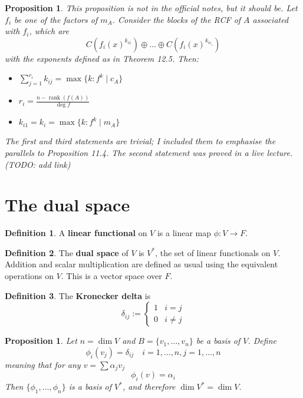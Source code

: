\documentclass[12pt]{article}
\newtheorem{prop}[thm]{Proposition}
\theoremstyle{definition}
\newtheorem*{defn*}{Definition}
\DeclareMathOperator{\rank}{rank}
\begin{document}
\begin{prop}
	This proposition is not in the official notes, but it should be.
	Let $f_i$ be one of the factors of $m_A$.
	Consider the blocks of the RCF of $A$ associated with $f_i$, which are
	$$C(f_i(x)^{k_{i1}}) \oplus \ldots \oplus C(f_i(x)^{k_{ir_i}})$$
	with the exponents defined as in Theorem 12.5.
	Then:
	\begin{itemize}
		\item $\sum_{j=1}^{r_i}k_{ij} = \max{\{k : f^k \mid c_A\}}$
		\item $r_i = \frac{n - \rank{(f(A))}}{\deg{f}}$
		\item $k_{i1} = k_i = \max{\{k : f^k \mid m_A\}}$
	\end{itemize}
	The first and third statements are trivial; I included them to emphasise the parallels to Proposition 11.4.
	The second statement was proved in a live lecture. (TODO: add link)
\end{prop}

%

\section{The dual space}

\begin{defn*}
	A \textbf{linear functional} on $V$ is a linear map $\phi : V \to F$.
\end{defn*}

\begin{defn*}
	The \textbf{dual space} of $V$ is $V^{\ast}$, the set of linear functionals on $V$.
	Addition and scalar multiplication are defined as usual using the equivalent operations on $V$.
	This is a vector space over $F$.
\end{defn*}

\begin{defn*}
	The \textbf{Kronecker delta} is
	$$\delta_{ij} := \begin{cases} 1 & i = j \\ 0 & i \neq j \end{cases}$$
\end{defn*}

\begin{prop}
	Let $n = \dim{V}$ and $B = \{v_1, \ldots, v_n\}$ be a basis of $V$.
	Define
	$$\phi_i(v_j) = \delta_{ij}\quad i = 1, \ldots, n, j = 1, \ldots, n$$
	meaning that for any $v = \sum\alpha_jv_j$
	$$\phi_i(v) = \alpha_i$$
	Then $\{\phi_1, \ldots, \phi_n\}$ is a basis of $V^{\ast}$, and therefore $\dim{V^{\ast}} = \dim{V}$.
\end{prop}
\end{document}
